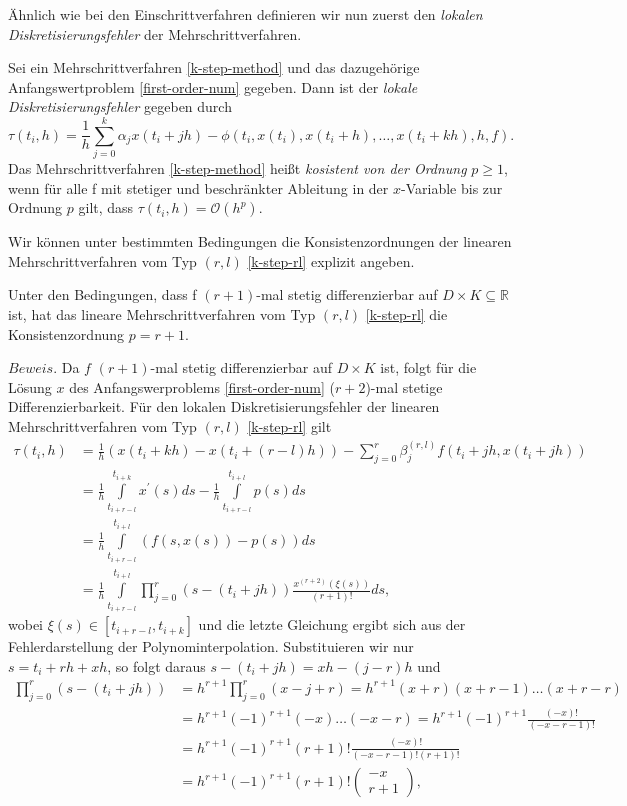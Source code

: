 Ähnlich wie bei den Einschrittverfahren definieren wir nun zuerst den {\em lokalen Diskretisierungsfehler} der
Mehrschrittverfahren.
\begin{definition}
    Sei ein Mehrschrittverfahren \eqref{k-step-method} und das dazugehörige Anfangswertproblem \eqref{first-order-num}
    gegeben. Dann ist der {\em lokale Diskretisierungsfehler} gegeben durch
    \[
        \tau(t_i,h) = \frac{1}{h} \sum_{j=0}^{k} \alpha_j x(t_i + jh) -
        \phi (t_i,x(t_i), x(t_i+h), \dots, x(t_i+kh),h,f).
    \]
    Das Mehrschrittverfahren \eqref{k-step-method} heißt {\em kosistent von der Ordnung} $p\geq 1$, wenn für alle f mit
    stetiger und beschränkter Ableitung in der $x$-Variable bis zur Ordnung $p$ gilt, dass
    $\tau(t_i,h) = \mathcal{O}(h^p)$.
\end{definition}
Wir können unter bestimmten Bedingungen die Konsistenzordnungen der linearen Mehrschrittverfahren vom Typ $(r,l)$
\eqref{k-step-rl} explizit angeben.
\begin{satz}
    Unter den Bedingungen, dass f $(r+1)$-mal stetig differenzierbar auf $D \times K \subseteq \mathbb{R}$ ist, hat
    das lineare Mehrschrittverfahren vom Typ $(r,l)$ \eqref{k-step-rl} die Konsistenzordnung $p=r+1$.
\end{satz}
$Beweis.$ Da $f$ $(r+1)$-mal stetig differenzierbar auf $D \times K$ ist, folgt für die Lösung $x$ des Anfangswerproblems
\eqref{first-order-num} ($r+2$)-mal stetige Differenzierbarkeit. Für den lokalen Diskretisierungsfehler der linearen
Mehrschrittverfahren vom Typ $(r,l)$ \eqref{k-step-rl} gilt
\begin{align*}
    \tau(t_i, h) &= \frac{1}{h} (x(t_i + kh) - x(t_i + (r-l)h)) -
    \sum\limits_{j=0}^{r}\beta_j^{(r,l)}f(t_i+jh, x(t_i +jh))\\
    &= \frac{1}{h} \int\limits_{t_{i+r-l}}^{t_{i+k}} x^{\prime}(s)ds -
    \frac{1}{h} \int\limits_{t_{i+r-l}}^{t_{i+l}} p(s) ds \\
    &= \frac{1}{h} \int\limits_{t_{i+r-l}}^{t_{i+l}} \left( f(s,x(s)) - p(s) \right) ds \\
    &= \frac{1}{h} \int\limits_{t_{i+r-l}}^{t_{i+l}} \prod\limits_{j=0}^{r} (s - (t_i + jh))
    \frac{x^{(r+2)}(\xi(s))}{(r+1)!} ds,
\end{align*}
wobei $\xi(s) \in [t_{i+r-l}, t_{i+k}]$ und die letzte Gleichung ergibt sich aus der Fehlerdarstellung der
Polynominterpolation. Substituieren wir nur $s = t_i + rh + xh$, so folgt daraus $s- (t_i +jh) = xh - (j-r)h$ und
\begin{align*}
    \prod\limits_{j=0}^{r} (s - (t_i +jh)) &= h^{r+1} \prod\limits_{j=0}^{r} (x-j+r) = h^{r+1}(x+r)(x+r-1) \dots (x+r-r)\\
    &= h^{r+1}(-1)^{r+1}(-x)\dots (-x-r) = h^{r+1}(-1)^{r+1}\frac{(-x)!}{(-x-r-1)!}\\
    &= h^{r+1}(-1)^{r+1}(r+1)! \frac{(-x)!}{(-x-r-1)!(r+1)!}\\
&= h^{r+1}(-1)^{r+1}(r+1)! \begin{pmatrix}  -x \\  r+1  \end{pmatrix},
\end{align*}
